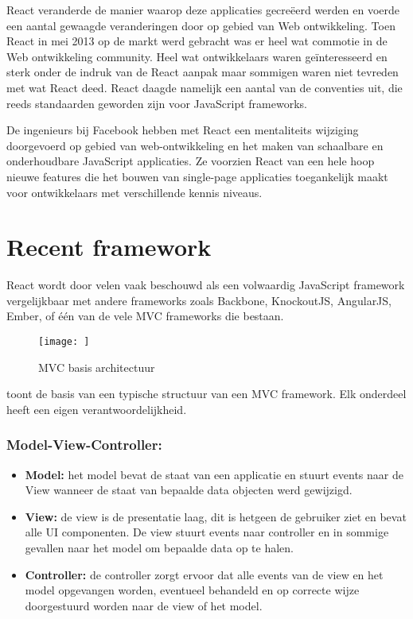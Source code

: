 	React veranderde de manier waarop deze applicaties gecreëerd werden en voerde een aantal gewaagde veranderingen door op gebied van Web ontwikkeling. Toen React in mei 2013 op de markt werd gebracht was er heel wat commotie in de Web ontwikkeling community. Heel wat ontwikkelaars waren geïnteresseerd en sterk onder de indruk van de React aanpak maar sommigen waren niet tevreden met wat React deed. React daagde namelijk een aantal van de conventies uit, die reeds standaarden geworden zijn voor JavaScript frameworks.
	
	De ingenieurs bij Facebook hebben met React een mentaliteits wijziging doorgevoerd op gebied van web-ontwikkeling en het maken van schaalbare en onderhoudbare JavaScript applicaties. Ze voorzien React van een hele hoop nieuwe features die het bouwen van single-page applicaties toegankelijk maakt voor ontwikkelaars met verschillende kennis niveaus.
	
\section{Recent framework}
	
	React wordt door velen vaak beschouwd als een volwaardig JavaScript framework vergelijkbaar met andere frameworks zoals Backbone, KnockoutJS, AngularJS, Ember, of één van de vele MVC frameworks die bestaan.
	
	\begin{figure}
		\centering
		\texttt{[image: ]}
		\caption{MVC basis architectuur}
		\label{fig:mvcbasis}
	\end{figure}
	
	 toont de basis van een typische structuur van een MVC framework. Elk onderdeel heeft een eigen verantwoordelijkheid.
	
	\subsubsection*{Model-View-Controller:}
	\begin{itemize}
		\item \textbf{Model:} het model bevat de staat van een applicatie en stuurt events naar de View wanneer de staat van bepaalde data objecten werd gewijzigd.
		\item \textbf{View:} de view is de presentatie laag, dit is hetgeen de gebruiker ziet en bevat alle UI componenten. De view stuurt events naar controller en in sommige gevallen naar het model om bepaalde data op te halen.
		\item \textbf{Controller:} de controller zorgt ervoor dat alle events van de view en het model opgevangen worden, eventueel behandeld en op correcte wijze doorgestuurd worden naar de view of het model.
	\end{itemize}
	
